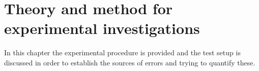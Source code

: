 \chapter{Theory and method for experimental investigations}

In this chapter the experimental procedure is provided and the test setup is discussed in order to establish the sources of errors and trying to quantify these.